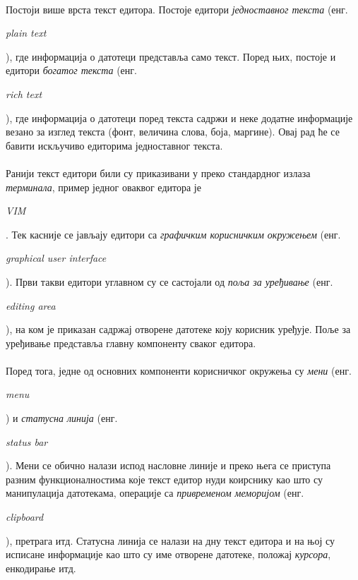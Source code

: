 \documentclass[12pt,oneside]{memoir}
\begin{document}
\paragraph{}
Постоји више врста текст едитора. Постоје едитори \emph{једноставног текста}
(енг. \begin{latinica}\textit{plain text}\end{latinica}), где информација
о датотеци представља само текст. Поред њих, постоје и едитори \emph{богатог текста}
(енг. \begin{latinica}\textit{rich text}\end{latinica}), где информација о датотеци
поред текста садржи и неке додатне информације везано за изглед текста (фонт, величина слова, боја, маргине). Овај рад ће се бавити искључиво
едиторима једноставног текста.

\paragraph{}
Ранији текст едитори били су приказивани у преко стандардног излаза \emph{терминала}, 
пример једног оваквог едитора је \begin{latinica}\textit{VIM}\end{latinica} \cite{VIM}. 
Тек касније се јављају едитори са \emph{графичким корисничким окружењем} 
(енг. \begin{latinica}\textit{graphical user interface}\end{latinica}). Први
такви едитори углавном су се састојали од \emph{поља за уређивање} 
(енг. \begin{latinica}\textit{editing area}\end{latinica}), на ком је
приказан садржај отворене датотеке коју корисник уређује. Поље за уређивање
представља главну компоненту сваког едитора. 

\paragraph{}
Поред тога, једне од основних компоненти
корисничког окружења су \emph{мени} (енг. \begin{latinica}\textit{menu}\end{latinica}) и
\emph{статусна линија} (енг. \begin{latinica}\textit{status bar}\end{latinica}). 
Мени се обично налази испод насловне линије и преко њега се приступа разним
функционалностима које текст едитор нуди коирснику као што су манипулација датотекама,
операције са \emph{привременом меморијом} 
(енг. \begin{latinica}\textit{clipboard}\end{latinica}),
претрага итд. Статусна линија се налази на дну текст едитора и на њој су исписане
информације као што су име отворене датотеке, положај \emph{курсора}, енкодирање итд.
\end{document}
